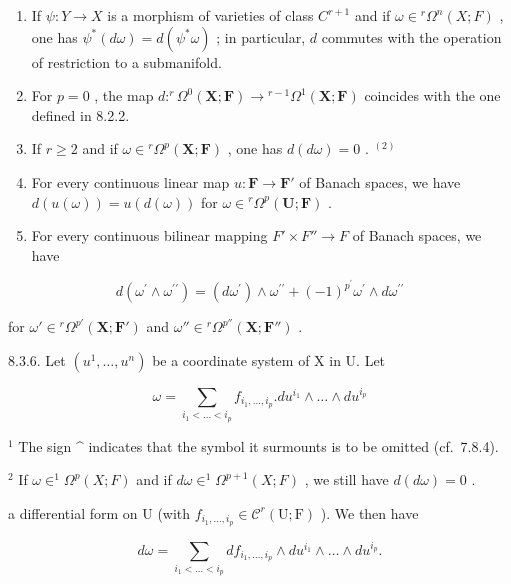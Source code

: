 \begin{enumerate}
\def\labelenumi{(\arabic{enumi})}
\setcounter{enumi}{5}
\item
  If \(\psi: Y \to X\) is a morphism of varieties of class \(C^{r+1}\) and if \(\omega \in {}^r\Omega^n(X; F)\) , one has \(\psi^*(d\omega) = d(\psi^*\omega)\) ; in particular, \(d\) commutes with the operation of restriction to a submanifold.
\item
  For \(p = 0\) , the map \(d: ^r\Omega^0(\mathbf{X}; \mathbf{F}) \to {}^{r-1}\Omega^1(\mathbf{X}; \mathbf{F})\) coincides with the one defined in 8.2.2.
\item
  If \(r \geqslant 2\) and if \(\omega \in {}^r\Omega^p(\mathbf{X};\mathbf{F})\) , one has \(d(d\omega) = 0\) . \(^{(2)}\)
\item
  For every continuous linear map \(u: \mathbf{F} \to \mathbf{F}'\) of Banach spaces, we have \(d(u(\omega)) = u(d(\omega))\) for \(\omega \in {}^{r}\Omega^{p}(\mathbf{U}; \mathbf{F})\) .
\item
  For every continuous bilinear mapping \(F' \times F'' \rightarrow F\) of Banach spaces, we have
\end{enumerate}

\[
d \left(\omega^ {\prime} \wedge \omega^ {\prime \prime}\right) = \left(d \omega^ {\prime}\right) \wedge \omega^ {\prime \prime} + (- 1) ^ {p ^ {\prime}} \omega^ {\prime} \wedge d \omega^ {\prime \prime}
\]

for \(\omega' \in {}^r\Omega^{p'}(\mathbf{X}; \mathbf{F}')\) and \(\omega'' \in {}^r\Omega^{p''}(\mathbf{X}; \mathbf{F}'')\) .


8.3.6. Let \((u^{1},\ldots ,u^{n})\) be a coordinate system of X in U. Let

\[
\omega = \sum_ {i _ {1} <   \dots <   i _ {p}} f _ {i _ {1}, \dots , i _ {p}}. d u ^ {i _ {1}} \wedge \dots \wedge d u ^ {i _ {p}}
\]

\(^{1}\) The sign \^{} indicates that the symbol it surmounts is to be omitted (cf.~7.8.4).

\(^{2}\) If \(\omega\in^{1}\Omega^{p}(X;F)\) and if \(d\omega\in^{1}\Omega^{p+1}(X;F)\) , we still have \(d(d\omega)=0\) .

a differential form on U (with \(f_{i_1,\ldots,i_p} \in \mathcal{C}^r(\mathrm{U};\mathrm{F})\) ). We then have

\[
d \omega = \sum_ {i _ {1} <   \dots <   i _ {p}} d f _ {i _ {1}, \dots , i _ {p}} \wedge d u ^ {i _ {1}} \wedge \dots \wedge d u ^ {i _ {p}}.\tag{11}
\]

